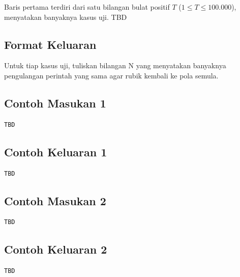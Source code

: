 \documentclass{article}
\begin{document}
Baris pertama terdiri dari satu bilangan bulat positif $T$ ($1 \leq T \leq 100.000$), menyatakan banyaknya kasus uji.
TBD

\subsection*{Format Keluaran}

Untuk tiap kasus uji, tuliskan bilangan N yang menyatakan banyaknya pengulangan perintah yang sama agar rubik kembali ke pola semula.
\\

\begin{multicols}{2}
\subsection*{Contoh Masukan 1}
\begin{lstlisting}
TBD
\end{lstlisting}
\columnbreak
\subsection*{Contoh Keluaran 1}
\begin{lstlisting}
TBD
\end{lstlisting}
\vfill
\null
\end{multicols}

\begin{multicols}{2}
\subsection*{Contoh Masukan 2}
\begin{lstlisting}
TBD
\end{lstlisting}
\columnbreak
\subsection*{Contoh Keluaran 2}
\begin{lstlisting}
TBD
\end{lstlisting}
\vfill
\null
\end{multicols}


\pagebreak
\end{document}
